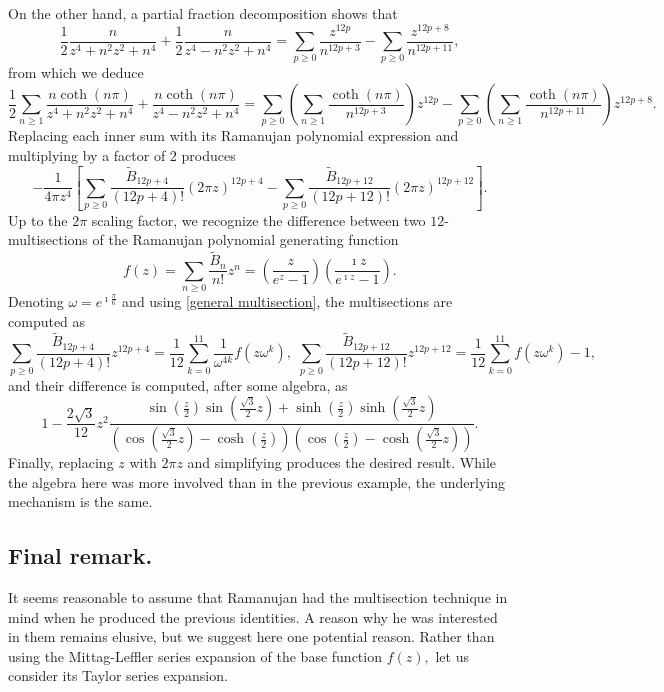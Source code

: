 \documentclass[11pt,oneside,reqno]{article}
\theoremstyle{definition}
\begin{document}
On the other hand, a  partial fraction decomposition shows that
\[\frac{1}{2}\frac{n}{z^{4}+n^{2}z^{2}+n^{4}}+\frac{1}{2}\frac{n}{z^{4}-n^{2}z^{2}+n^{4}}
=\sum_{p\ge0}\frac{z^{12p}}{n^{12p+3}}-\sum_{p\ge0}\frac{z^{12p+8}}{n^{12p+11}},
\]
from which we deduce
\[
\frac{1}{2}\sum_{n\ge1}\frac{n\coth\left(n\pi\right)}{z^{4}+n^{2}z^{2}+n^{4}}+\frac{n\coth\left(n\pi\right)}{z^{4}-n^{2}z^{2}+n^{4}}
=\sum_{p\ge0}\left(\sum_{n\ge1}\frac{\coth\left(n\pi\right)}{n^{12p+3}}\right)z^{12p}-\sum_{p\ge0}\left(\sum_{n\ge1}\frac{\coth\left(n\pi\right)}{n^{12p+11}}\right)z^{12p+8}.\]
Replacing each inner sum with its Ramanujan polynomial expression and multiplying by a factor of $2$ produces
\[
-\frac{1}{4\pi z^{4}}\left[\sum_{p\ge0}\frac{\tilde{B}_{12p+4}}{\left(12p+4\right)!}\left(2\pi z\right)^{12p+4}-\sum_{p\ge0}\frac{\tilde{B}_{12p+12}}{\left(12p+12\right)!}\left(2\pi z\right)^{12p+12}\right].
\]
Up to the $2\pi$  scaling factor, we recognize the difference between two $12$-multisections of the Ramanujan polynomial generating function
\[
f\left(z\right)=\sum_{n\ge0}\frac{\tilde{B}_{n}}{n!}z^{n}=\left(\frac{z}{e^{z}-1}\right)\left(\frac{\imath z}{e^{\imath z}-1}\right).
\]
Denoting $\omega=e^{\imath\frac{\pi}{6}}$  and using \eqref{general multisection}, the multisections are computed as
\[
\sum_{p\ge0}\frac{\tilde{B}_{12p+4}}{\left(12p+4\right)!}z^{12p+4}=\frac{1}{12}\sum_{k=0}^{11}\frac{1}{\omega^{4k}}f\left(z\omega^{k}\right),\,\,\sum_{p\ge0}\frac{\tilde{B}_{12p+12}}{\left(12p+12\right)!}z^{12p+12}=\frac{1}{12}\sum_{k=0}^{11}f\left(z\omega^{k}\right)-1,
\]
and their difference is computed, after some algebra, as
\[
1-\frac{2\sqrt{3}}{12}z^{2}\frac{\sin\left(\frac{z}{2}\right)\sin\left(\frac{\sqrt{3}}{2}z\right)+\sinh\left(\frac{z}{2}\right)\sinh\left(\frac{\sqrt{3}}{2}z\right)}{\left(\cos\left(\frac{\sqrt{3}}{2}z\right)-\cosh\left(\frac{z}{2}\right)\right)\left(\cos\left(\frac{z}{2}\right)-\cosh\left(\frac{\sqrt{3}}{2}z\right)\right)}.
\]
Finally, replacing $z$ with $2\pi z$ and simplifying produces the desired result. While the algebra here was more involved than in the previous example, the underlying mechanism is the same.

\subsection{Final remark.}
It seems reasonable to assume that Ramanujan had the multisection technique in mind when he produced the previous identities. A reason why he was interested in them remains elusive, but we suggest here one potential reason. Rather than using the Mittag-Leffler series expansion of the base function $f(z),$ let us consider its Taylor series expansion.
\end{document}
